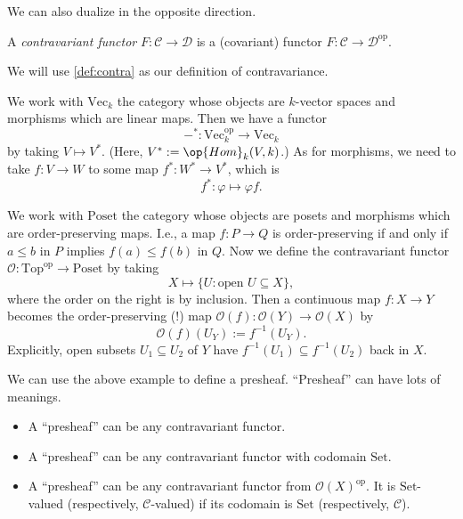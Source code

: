 We can also dualize in the opposite direction.
\begin{definition}
	A \textit{contravariant functor} $F:\mathcal C\to\mathcal D$ is a (covariant) functor $F:\mathcal C\to\mathcal D^\mathrm{op}$.
\end{definition}
\begin{warn}
	We will use \autoref{def:contra} as our definition of contravariance.
\end{warn}
\begin{example}
	We work with $\mathrm{Vec}_k$ the category whose objects are $k$-vector spaces and morphisms which are linear maps. Then we have a functor
	\[-^*:\mathrm{Vec}_k^\mathrm{op}\to\mathrm{Vec}_k\]
	by taking $V\mapsto V^*$. (Here, $V^*:=\op{Hom}_k(V,k)$.) As for morphisms, we need to take $f:V\to W$ to some map $f^*:W^*\to V^*$, which is
	\[f^*:\varphi\mapsto\varphi f.\]
\end{example}
\begin{example}
	We work with $\mathrm{Poset}$ the category whose objects are posets and morphisms which are order-preserving maps. I.e., a map $f:P\to Q$ is order-preserving if and only if $a\le b$ in $P$ implies $f(a)\le f(b)$ in $Q$. Now we define the contravariant functor $\mathcal O:\mathrm{Top}^\mathrm{op}\to\mathrm{Poset}$ by taking
	\[X\mapsto\{U:\text{open }U\subseteq X\},\]
	where the order on the right is by inclusion. Then a continuous map $f:X\to Y$ becomes the order-preserving (!) map $\mathcal O(f):\mathcal O(Y)\to\mathcal O(X)$ by
	\[\mathcal O(f)(U_Y):=f^{-1}(U_Y).\]
	Explicitly, open subsets $U_1\subseteq U_2$ of $Y$ have $f^{-1}(U_1)\subseteq f^{-1}(U_2)$ back in $X$.
\end{example}
\begin{remark}
	We can use the above example to define a presheaf. ``Presheaf'' can have lots of meanings.
	\begin{itemize}
		\item A ``presheaf'' can be any contravariant functor.
		\item A ``presheaf'' can be any contravariant functor with codomain $\mathrm{Set}$.
		\item A ``presheaf'' can be any contravariant functor from $\mathcal O(X)^\mathrm{op}$. It is $\mathrm{Set}$-valued (respectively, $\mathcal C$-valued) if its codomain is $\mathrm{Set}$ (respectively, $\mathcal C$).
	\end{itemize}
\end{remark}

